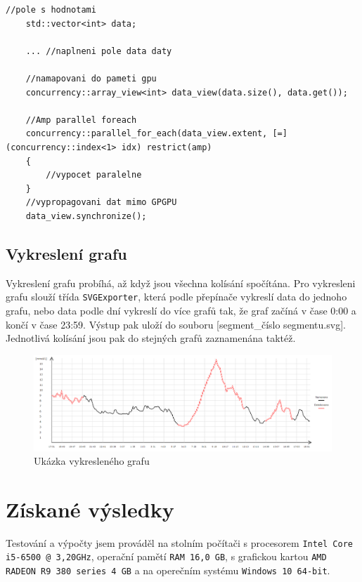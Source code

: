 \documentclass{article}
\begin{document}
	\begin{minipage}{\linewidth}
	\begin{lstlisting}[label={lst:ampPara}]
	//pole s hodnotami
	std::vector<int> data;
	
	... //naplneni pole data daty
	
	//namapovani do pameti gpu
	concurrency::array_view<int> data_view(data.size(), data.get());
	
	//Amp parallel foreach
	concurrency::parallel_for_each(data_view.extent, [=](concurrency::index<1> idx) restrict(amp)
	{
		//vypocet paralelne
	}
	//vypropagovani dat mimo GPGPU 
	data_view.synchronize();
	\end{lstlisting} 
	\end{minipage}
	
	\subsection{Vykreslení grafu}
	Vykreslení grafu probíhá, až když jsou všechna kolísání spočítána.
	Pro vykresleni grafu slouží třída \texttt{SVGExporter}, která podle přepínače vykreslí data do jednoho grafu, nebo data podle dní vykreslí do více grafů tak, že graf začíná v čase 0:00 a končí v čase 23:59. Výstup pak uloží do souboru [segment\_číslo segmentu.svg]. Jednotlivá kolísání jsou pak do stejných grafů zaznamenána taktéž.
	
	\begin{figure}[ht!]
	\centering
	\includegraphics[width=1.0\linewidth]{ukazkaGrafu}
	\caption[Ukázka vykresleného grafu]{Ukázka vykresleného grafu}
	\label{fig:ukazkagrafu}
	\end{figure}
	
	\section{Získané výsledky}
	\label{chap:zhodnoceni}
	\par Testování a výpočty jsem prováděl na stolním počítači s procesorem \texttt{Intel Core i5-6500 @ 3,20GHz}, operační pamětí \texttt{RAM 16,0 GB}, s grafickou kartou \texttt{AMD RADEON R9 380 series 4 GB} a na operečním systému \texttt{Windows 10 64-bit}.
	
\end{document}
